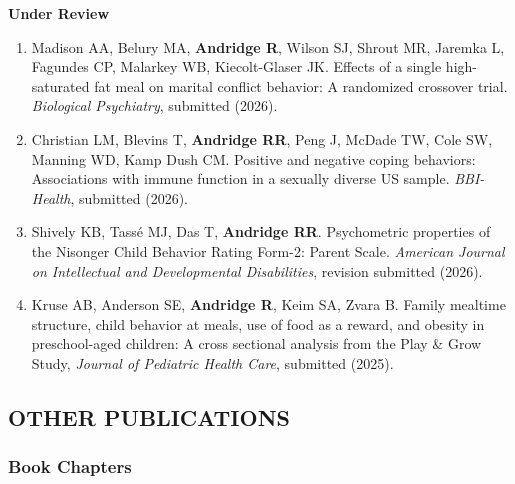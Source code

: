 \documentclass[
  english,
  letterpaper,
  DIV=11,
  numbers=noendperiod]{scrartcl}
\providecommand{\tightlist}{%
  \setlength{\itemsep}{0pt}\setlength{\parskip}{0pt}}
\begin{document}
\textbf{Under Review}

\begin{enumerate}
\def\labelenumi{\arabic{enumi}.}
\tightlist
\item
  Madison AA, Belury MA, \textbf{Andridge R}, Wilson SJ, Shrout MR,
  Jaremka L, Fagundes CP, Malarkey WB, Kiecolt-Glaser JK. Effects of a
  single high-saturated fat meal on marital conflict behavior: A
  randomized crossover trial. \emph{Biological Psychiatry}, submitted
  (2026).
\item
  Christian LM, Blevins T, \textbf{Andridge RR}, Peng J, McDade TW, Cole
  SW, Manning WD, Kamp Dush CM. Positive and negative coping behaviors:
  Associations with immune function in a sexually diverse US sample.
  \emph{BBI-Health}, submitted (2026).
\item
  Shively KB, Tassé MJ, Das T, \textbf{Andridge RR}. Psychometric
  properties of the Nisonger Child Behavior Rating Form-2: Parent Scale.
  \emph{American Journal on Intellectual and Developmental
  Disabilities}, revision submitted (2026).
\item
  Kruse AB, Anderson SE, \textbf{Andridge R}, Keim SA, Zvara B. Family
  mealtime structure, child behavior at meals, use of food as a reward,
  and obesity in preschool-aged children: A cross sectional analysis
  from the Play \& Grow Study, \emph{Journal of Pediatric Health Care},
  submitted (2025).
\end{enumerate}

\subsection{OTHER PUBLICATIONS}\label{other-publications}

\subsubsection{Book Chapters}\label{book-chapters}
\end{document}
